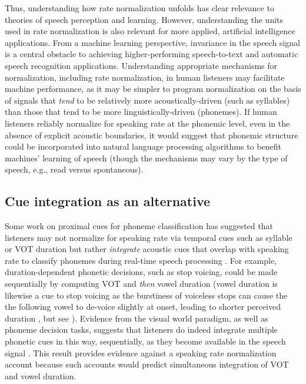 \documentclass[preprint]{JASA}
\begin{document}
Thus, understanding how rate normalization unfolds has clear relevance to theories of speech perception and learning. However, understanding the units used in rate normalization is also relevant for more applied, artificial intelligence applications. From a machine learning perspective, invariance in the speech signal is a central obstacle to achieving higher-performing speech-to-text and automatic speech recognition applications. Understanding appropriate mechanisms for normalization, including rate normalization, in human listeners may facilitate machine performance, as it may be simpler to program normalization on the basis of signals that \textit{tend} to be relatively more acoustically-driven (such as syllables) than those that tend to be more linguistically-driven (phonemes). If human listeners reliably normalize for speaking rate at the phonemic level, even in the absence of explicit acoustic boundaries, it would suggest that phonemic structure could be incorporated into natural language processing algorithms to benefit machines' learning of speech (though the mechanisms may vary by the type of speech, e.g., read versus spontaneous).  

\subsection{Cue integration as an alternative}

Some work on proximal cues for phoneme classification has suggested that listeners may not normalize for speaking rate via temporal cues such as syllable or VOT duration but rather \textit{integrate} acoustic cues that overlap with speaking rate to classify phonemes during real-time speech processing \citep{massaroConsonantVowelRatio1983,toscanoCueIntegrationCategories2010,toscanoCueintegrationContextEffects2012,toscanoTimecourseSpeakingRate2015}. For example, duration-dependent phonetic decisions, such as stop voicing, could be made sequentially by computing VOT and \textit{then} vowel duration (vowel duration is likewise a cue to stop voicing as the burstiness of voiceless stops can cause the the following vowel to de-voice slightly at onset, leading to shorter perceived duration \citep{allenEffectsSyllableinitialVoicing1999}, but see \citet{turkAcousticSegmentDurations2006}). Evidence from the visual world paradigm, as well as phoneme decision tasks, suggests that listeners do indeed integrate multiple phonetic cues in this way, sequentially, as they become available in the speech signal  \citep{mcmurrayTrackingTimeCourse2008,millerEffectsSpeakingRate1988,toscanoTimecourseSpeakingRate2015}. This result provides evidence against a speaking rate normalization account because such accounts would predict simultaneous integration of VOT and vowel duration. 
\end{document}
